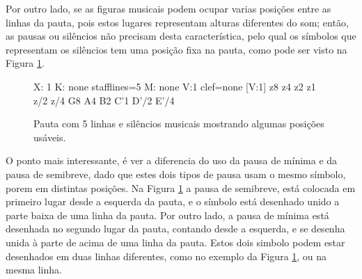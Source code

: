 Por outro lado, se as figuras musicais podem ocupar varias posições entre as linhas da pauta,
pois estos lugares representam alturas diferentes do som; então, 
as pausas  ou silêncios não precisam desta característica,
pelo qual os símbolos que representam os silêncios tem uma posição fixa na pauta,
como pode ser visto na Figura \ref{fig:abc-pautasilencio}.
\begin{figure}[h]
\centering
\begin{abc}[name=abc-pautasilencio]
%
X: 1 %
K: none stafflines=5 %
M: none %
V:1 clef=none %
%
[V:1] z8 z4 z2 z1 z/2 z/4 G8 A4 B2 C'1 D'/2 E'/4 
\end{abc}
\caption{Pauta com 5 linhas e silêncios musicais mostrando algumas posições usáveis.}
\label{fig:abc-pautasilencio}
\end{figure}

O ponto mais interessante, é ver a diferencia do uso  da pausa de mínima e da pausa de semibreve,
dado que estes dois tipos de pausa usam o mesmo símbolo, porem em distintas posições.
Na Figura \ref{fig:abc-pautasilencio} a pausa de semibreve, 
está colocada em primeiro lugar desde a esquerda da pauta,
e o símbolo está desenhado unido a parte baixa de uma linha da pauta.
Por outro lado, a pausa de mínima está desenhada no segundo lugar da pauta,
contando desde a esquerda, e se desenha unida à parte de acima de uma linha da pauta.
Estos dois simbolo podem estar desenhados em duas linhas diferentes, 
como no exemplo da Figura \ref{fig:abc-pautasilencio}, ou na mesma linha.

